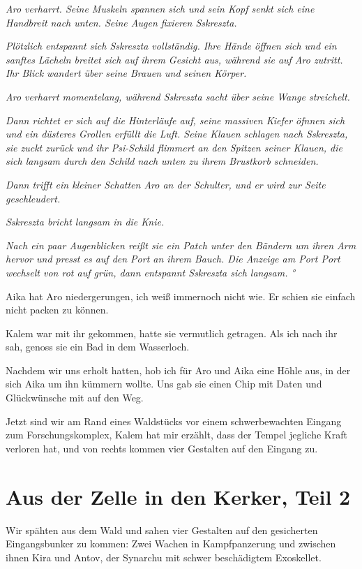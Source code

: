 \documentclass[11pt]{scrartcl}
\begin{document}
\emph{Aro verharrt. Seine Muskeln spannen sich und sein Kopf senkt sich
eine Handbreit nach unten. Seine Augen fixieren Sskreszta.}

\emph{Plötzlich entspannt sich Sskreszta vollständig. Ihre Hände öffnen
sich und ein sanftes Lächeln breitet sich auf ihrem Gesicht aus, während
sie auf Aro zutritt. Ihr Blick wandert über seine Brauen und seinen
Körper.}

\emph{Aro verharrt momentelang, während Sskreszta sacht über seine Wange
streichelt.}

\emph{Dann richtet er sich auf die Hinterläufe auf, seine massiven
Kiefer öfnnen sich und ein düsteres Grollen erfüllt die Luft. Seine
Klauen schlagen nach Sskreszta, sie zuckt zurück und ihr Psi-Schild
flimmert an den Spitzen seiner Klauen, die sich langsam durch den Schild
nach unten zu ihrem Brustkorb schneiden.}

\emph{Dann trifft ein kleiner Schatten Aro an der Schulter, und er wird
zur Seite geschleudert.}

\emph{Sskreszta bricht langsam in die Knie.}

\emph{Nach ein paar Augenblicken reißt sie ein Patch unter den Bändern
um ihren Arm hervor und presst es auf den Port an ihrem Bauch. Die
Anzeige am Port Port wechselt von rot auf grün, dann entspannt Sskreszta
sich langsam. °}

Aika hat Aro niedergerungen, ich weiß immernoch nicht wie. Er schien sie
einfach nicht packen zu können.

Kalem war mit ihr gekommen, hatte sie vermutlich getragen. Als ich nach
ihr sah, genoss sie ein Bad in dem Wasserloch.

Nachdem wir uns erholt hatten, hob ich für Aro und Aika eine Höhle aus,
in der sich Aika um ihn kümmern wollte. Uns gab sie einen Chip mit Daten
und Glückwünsche mit auf den Weg.

Jetzt sind wir am Rand eines Waldstücks vor einem schwerbewachten
Eingang zum Forschungskomplex, Kalem hat mir erzählt, dass der Tempel
jegliche Kraft verloren hat, und von rechts kommen vier Gestalten auf
den Eingang zu.

\section{Aus der Zelle in den Kerker, Teil 2}

Wir spähten aus dem Wald und sahen vier Gestalten auf den gesicherten
Eingangsbunker zu kommen: Zwei Wachen in Kampfpanzerung und zwischen
ihnen Kira und Antov, der Synarchu mit schwer beschädigtem Exoskellet.
\end{document}
